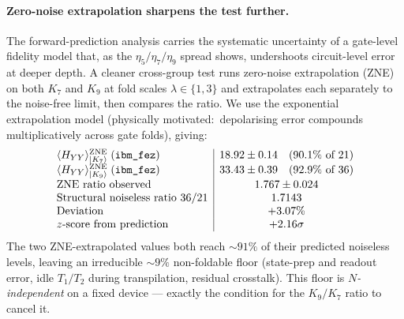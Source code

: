 \documentclass[11pt]{article}
\newcommand{\ket}[1]{\left|#1\right\rangle}
\begin{document}
\paragraph{Zero-noise extrapolation sharpens the test further.}
The forward-prediction analysis carries the systematic uncertainty
of a gate-level fidelity model that, as the $\eta_5/\eta_7/\eta_9$
spread shows, undershoots circuit-level error at deeper depth.  A
cleaner cross-group test runs zero-noise extrapolation (ZNE) on
both $K_7$ and $K_9$ at fold scales $\lambda \in \{1, 3\}$ and
extrapolates each separately to the noise-free limit, then
compares the ratio.  We use the exponential extrapolation model
(physically motivated:\ depolarising error compounds multiplicatively
across gate folds), giving:
\begin{equation}
  \label{eq:K9-zne}
  \begin{array}{l|c}
    \langle H_{YY}\rangle_{\ket{K_7}}^{\text{ZNE}} \;\text{(\texttt{ibm\_fez})}
        & 18.92 \pm 0.14 \quad (90.1\%\text{ of }21) \\
    \langle H_{YY}\rangle_{\ket{K_9}}^{\text{ZNE}} \;\text{(\texttt{ibm\_fez})}
        & 33.43 \pm 0.39 \quad (92.9\%\text{ of }36) \\
    \text{ZNE ratio observed} & 1.767 \pm 0.024 \\
    \text{Structural noiseless ratio } 36/21 & 1.7143 \\
    \text{Deviation} & +3.07\% \\
    z\text{-score from prediction} & +2.16\sigma
  \end{array}
\end{equation}
The two ZNE-extrapolated values both reach $\sim 91\%$ of their
predicted noiseless levels, leaving an irreducible $\sim 9\%$
non-foldable floor (state-prep and readout error, idle $T_1/T_2$
during transpilation, residual crosstalk).  This floor is
\emph{$N$-independent} on a fixed device --- exactly the condition
for the $K_9/K_7$ ratio to cancel it.
\end{document}
